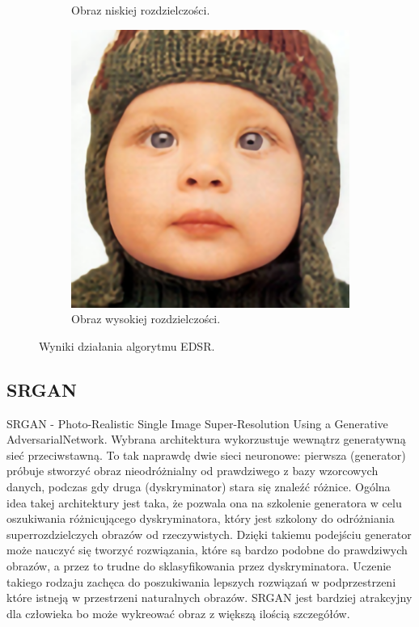 \documentclass[a4paper,11pt, notitlepage ]{article}
\begin{document}
\begin{figure}[h!]
\begin{subfigure}[b]{0.4\linewidth}
 		\caption{Obraz  niskiej rozdzielczości.}
 	\end{subfigure}
 	\begin{subfigure}[b]{0.4\linewidth}
 		\includegraphics[width=\linewidth]{EDSR/EDSR_OUTPUT.png}
 		\caption{Obraz wysokiej rozdzielczości.}
 	\end{subfigure}
 	\caption{Wyniki działania algorytmu EDSR.}
 	\label{fig:coffee3}
 \end{figure}
\newpage
\subsection{SRGAN}
SRGAN - Photo-Realistic Single Image Super-Resolution Using a Generative AdversarialNetwork. Wybrana architektura wykorzustuje wewnątrz generatywną sieć przeciwstawną. To tak naprawdę dwie sieci neuronowe: pierwsza (generator) próbuje stworzyć obraz nieodróżnialny od prawdziwego z bazy wzorcowych danych, podczas gdy druga (dyskryminator) stara się znaleźć różnice. Ogólna idea takej architektury jest taka, że pozwala ona na szkolenie generatora w celu oszukiwania różnicującego dyskryminatora, który jest szkolony do odróżniania superrozdzielczych obrazów od rzeczywistych. Dzięki takiemu podejściu generator może nauczyć się tworzyć rozwiązania, które są bardzo podobne do prawdziwych obrazów, a przez to trudne do sklasyfikowania przez dyskryminatora. Uczenie takiego rodzaju zachęca do poszukiwania  lepszych rozwiązań  w podprzestrzeni które istneją w przestrzeni naturalnych obrazów. SRGAN jest bardziej atrakcyjny dla człowieka bo może wykreować obraz z większą ilością szczegółów. 
\end{document}
